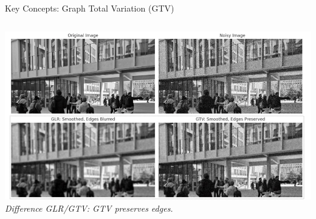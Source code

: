 \documentclass[aspectratio=169,xcolor=dvipsnames]{beamer}
\begin{document}
\begin{frame}{Key Concepts: Graph Total Variation (GTV)}
\begin{columns}[c]
\begin{column}{0.4\textwidth}
\begin{center}
    \includegraphics[width=0.95\linewidth]{GLR_vs_GTV_Image.png}
    \vspace{0.1cm}
    \tiny \textit{Difference GLR/GTV: GTV preserves edges.}
\end{center}

\end{column}

\end{columns}

\end{frame}
\end{document}
